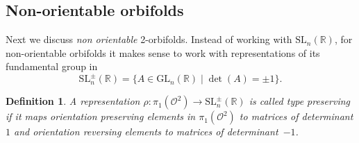 \documentclass[a4paper,11pt]{article}
\newtheorem{Definition}[Theorem]{Definition}
\begin{document}


 
% 
\subsection{Non-orientable orbifolds}
 \label{subsection:nonorientable}
Next we discuss \emph{non orientable} 2-orbifolds. 
Instead of working with $\mathrm{SL}_n(\mathbb R)$,
for non-orientable orbifolds it makes sense to work with representations of its  fundamental group in 
$$
 \mathrm{SL}^{\pm }_n (\mathbb R)=\{A\in\textrm{GL}_n(\mathbb R)\mid \det (A)=\pm 1\}.
$$ 

\begin{Definition}
\label{Definitiontp}
 A representation $\rho\colon\pi_1(\mathcal O^2)\to \mathrm{SL}^{\pm }_n (\mathbb R)$ is called 
 \emph{type preserving} if it maps  orientation preserving
 elements in $\pi_1(\mathcal O^2)$ 
 to matrices of determinant $1$ and orientation reversing
 elements to matrices of determinant~$-1$.
\end{Definition}
\end{document}

